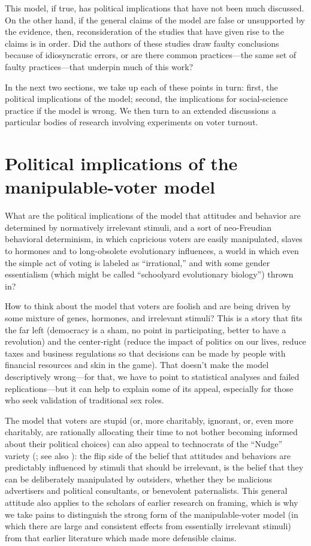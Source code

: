 \documentclass[11pt,letterpaper]{article}
\begin{document}
This model, if true, has political implications that have not been much
discussed. On the other hand, if the general claims of the model are false or
unsupported by the evidence, then, reconsideration of the studies that have
given rise to the claims is in order. Did the authors of these studies draw
faulty conclusions because of idiosyncratic errors, or are there common
practices---the same set of faulty practices---that underpin much of this work?

In the next two sections, we take up each of these points in turn: first, the
political implications of the model; second, the implications for social-science
practice if the model is wrong. We then turn to an extended discussions a
particular bodies of research involving experiments on voter turnout.

\section{Political implications of the manipulable-voter model}

What are the political implications of the model that attitudes and behavior
are determined by normatively irrelevant stimuli, and a sort of neo-Freudian
behavioral determinism, in which capricious voters are easily manipulated,
slaves to hormones and to long-obsolete evolutionary influences, a world in
which even the simple act of voting is labeled as ``irrational,'' and with some
gender essentialism (which might be called ``schoolyard evolutionary biology'')
thrown in?

How to think about the model that voters are foolish and are being driven by
some mixture of genes, hormones, and irrelevant stimuli? This is a story that
fits the far left (democracy is a sham, no point in participating, better to
have a revolution) and the center-right (reduce the impact of politics on our
lives, reduce taxes and business regulations so that decisions can be made by
people with financial resources and skin in the game). That doesn't make the
model descriptively wrong---for that, we have to point to statistical analyses
and failed replications---but it can help to explain some of its appeal,
especially for those who seek validation of traditional sex roles.

The model that voters are stupid (or, more charitably, ignorant, or, even more
charitably, are rationally allocating their time to not bother becoming informed
about their political choices) can also appeal to technocrats of the ``Nudge''
variety (\citet{thaler2008}; see also \citep{szaszi2022}): the flip side of the
belief that attitudes and behaviors are predictably influenced by stimuli that
should be irrelevant, is the belief that they can be deliberately manipulated by
outsiders, whether they be malicious advertisers and political consultants, or
benevolent paternalists. This general attitude also applies to the scholars of
earlier research on framing, which is why we take pains to distinguish the
strong form of the manipulable-voter model (in which there are large and
consistent effects from essentially irrelevant stimuli) from that earlier
literature which made more defensible claims.
\end{document}

